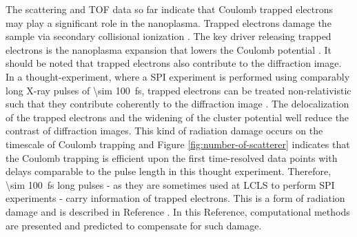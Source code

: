 The scattering and TOF data so far indicate that Coulomb trapped electrons may play a significant role in the nanoplasma. Trapped electrons damage the sample via secondary collisional ionization \cite{Hau-Riege-2004-PRE}. The key driver releasing trapped electrons is the nanoplasma expansion that lowers the Coulomb potential \cite{Arbeiter-2011-NJP}. It should be noted that trapped electrons also contribute to the diffraction image. In a thought-experiment, where a SPI experiment is performed using comparably long X-ray pulses of \SI{\sim 100}{\femto\second}, trapped electrons can be treated non-relativistic such that they contribute coherently to the diffraction image \cite{Williams-2016-PC}. The delocalization of the trapped electrons and the widening of the cluster potential well reduce the contrast of diffraction images. This kind of radiation damage occurs on the timescale of Coulomb trapping and Figure \ref{fig:number-of-scatterer} indicates that the Coulomb trapping is efficient upon the first time-resolved data points with delays comparable to the pulse length in this thought experiment. Therefore, \SI{\sim 100}{\femto\second} long pulses - as they are sometimes used at LCLS to perform SPI experiments - carry information of trapped electrons. This is a form of radiation damage and is described in Reference \citep{Quiney-2010-NatPhys}. In this Reference, computational methods are presented and predicted to compensate for such damage.\\[1\baselineskip]
%
%
%
%

